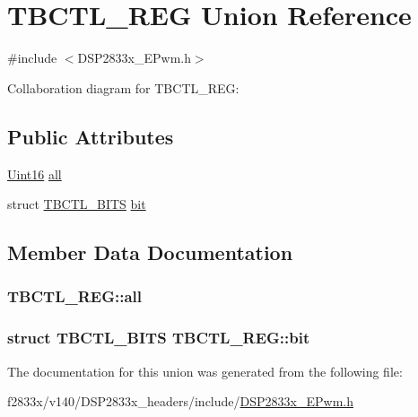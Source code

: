 \hypertarget{union_t_b_c_t_l___r_e_g}{}\section{T\+B\+C\+T\+L\+\_\+\+R\+E\+G Union Reference}
\label{union_t_b_c_t_l___r_e_g}


{\ttfamily \#include $<$D\+S\+P2833x\+\_\+\+E\+Pwm.\+h$>$}



Collaboration diagram for T\+B\+C\+T\+L\+\_\+\+R\+E\+G\+:
\subsection*{Public Attributes}
\begin{DoxyCompactItemize}
\item 
\hyperlink{_d_s_p2833x___device_8h_a59a9f6be4562c327cbfb4f7e8e18f08b}{Uint16} \hyperlink{union_t_b_c_t_l___r_e_g_a795f0d7112e6255bc16b60a475da48c6}{all}
\item 
struct \hyperlink{struct_t_b_c_t_l___b_i_t_s}{T\+B\+C\+T\+L\+\_\+\+B\+I\+T\+S} \hyperlink{union_t_b_c_t_l___r_e_g_a3711d8f5d94af524e24c1a428d7cbd57}{bit}
\end{DoxyCompactItemize}


\subsection{Member Data Documentation}
\hypertarget{union_t_b_c_t_l___r_e_g_a795f0d7112e6255bc16b60a475da48c6}{}
\subsubsection[{all}]{ T\+B\+C\+T\+L\+\_\+\+R\+E\+G\+::all}\label{union_t_b_c_t_l___r_e_g_a795f0d7112e6255bc16b60a475da48c6}
\hypertarget{union_t_b_c_t_l___r_e_g_a3711d8f5d94af524e24c1a428d7cbd57}{}
\subsubsection[{bit}]{\setlength{\rightskip}{0pt plus 5cm}struct {\bf T\+B\+C\+T\+L\+\_\+\+B\+I\+T\+S} T\+B\+C\+T\+L\+\_\+\+R\+E\+G\+::bit}\label{union_t_b_c_t_l___r_e_g_a3711d8f5d94af524e24c1a428d7cbd57}


The documentation for this union was generated from the following file\+:\begin{DoxyCompactItemize}
\item 
f2833x/v140/\+D\+S\+P2833x\+\_\+headers/include/\hyperlink{_d_s_p2833x___e_pwm_8h}{D\+S\+P2833x\+\_\+\+E\+Pwm.\+h}\end{DoxyCompactItemize}
